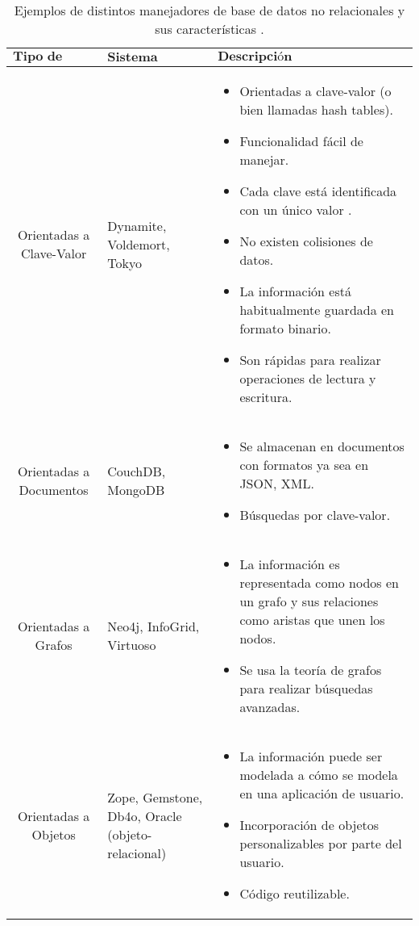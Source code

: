 \begin{table}[H]
	\centering 
	\caption{Ejemplos de distintos manejadores de base de datos no 
		relacionales y sus características 
		\cite{inv_storage_data, bd_nosql_tipos}.}
	\label{tabla:bd:manejadores:oop}
	\begin{tabular*}{0.9\textwidth}{@{\extracolsep{\fill}} |c|l|l|}
		\hline
		$\textbf{Tipo de base de datos}$ & $\textbf{Sistema Gestor}$ &
		$\textbf{Descripción}$
		\\\hline \hline
		\parbox[t]{4cm}{Orientadas a Clave-Valor} &
		\parbox[t]{3cm}{Dynamite, Voldemort, Tokyo} & 
		\parbox[t]{5.5cm}{
		\begin{itemize}
		\item Orientadas a clave-valor (o bien llamadas hash tables).
		\item Funcionalidad fácil de manejar.
		\item Cada clave está identificada con un único valor .
		\item No existen colisiones de datos. 
		\item La información está habitualmente guardada en formato 
			binario. 
		\item Son rápidas para realizar operaciones de lectura y 
			escritura.
		\end{itemize}
		} \\\hline
		\parbox[t]{4cm}{Orientadas a Documentos} &
		\parbox[t]{3cm}{CouchDB, MongoDB} &
		\parbox[t]{5.5cm}{
		\begin{itemize}
		\item Se almacenan en documentos con formatos ya sea en JSON, 
			XML.
		\item Búsquedas por clave-valor.
		\end{itemize}
		} \\\hline
		\parbox[t]{4cm}{Orientadas a Grafos} &
		\parbox[t]{3cm}{Neo4j, InfoGrid, Virtuoso} &
		\parbox[t]{5.5cm}{
		\begin{itemize}
		\item La información es representada como nodos en un grafo y 
			sus relaciones como aristas que unen los nodos. 
		\item Se usa la teoría de grafos para  realizar búsquedas 
			avanzadas.
		\end{itemize}
		} \\\hline
		\parbox[t]{4cm}{Orientadas a Objetos} &
		\parbox[t]{3cm}{Zope, Gemstone, Db4o, Oracle
		(objeto-relacional)} &
		\parbox[t]{5.5cm}{
		\begin{itemize}
		\item La información puede ser modelada a cómo se modela en una 
			aplicación de usuario.
		\item Incorporación de objetos personalizables por parte del 
			usuario.
		\item Código reutilizable.
		\end{itemize}
		} \\\hline
	\end{tabular*}
\end{table}
